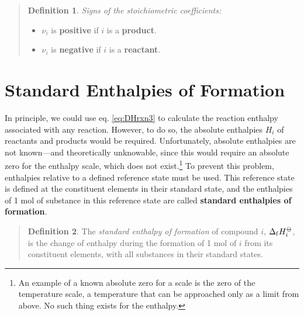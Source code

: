 \documentclass[
  9pt,
]{extbook}
\providecommand{\tightlist}{%
  \setlength{\itemsep}{0pt}\setlength{\parskip}{0pt}}
\theoremstyle{definition}
\newtheorem{definition}{Definition}[chapter]
\theoremstyle{definition}
\theoremstyle{definition}
\theoremstyle{remark}
\begin{document}
\begin{quote}
\begin{definition}
\protect\hypertarget{def:nui}{}{\label{def:nui} }\emph{Signs of the stoichiometric coefficients:}

\begin{itemize}
\tightlist
\item
  \(\nu_i\) is \textbf{positive} if \(i\) is a \textbf{product}.
\item
  \(\nu_i\) is \textbf{negative} if \(i\) is a \textbf{reactant}.
\end{itemize}
\end{definition}
\end{quote}

\hypertarget{formenthalpy}{%
\section{Standard Enthalpies of Formation}\label{formenthalpy}}

In principle, we could use eq. \eqref{eq:DHrxn3} to calculate the reaction enthalpy associated with any reaction. However, to do so, the absolute enthalpies \(H_i\) of reactants and products would be required. Unfortunately, absolute enthalpies are not known---and theoretically unknowable, since this would require an absolute zero for the enthalpy scale, which does not exist.\footnote{An example of a known absolute zero for a scale is the zero of the temperature scale, a temperature that can be approached only as a limit from above. No such thing exists for the enthalpy.} To prevent this problem, enthalpies relative to a deﬁned reference state must be used. This reference state is defined at the constituent elements in their standard state, and the enthalpies of 1 mol of substance in this reference state are called \textbf{standard enthalpies of formation}.

\begin{quote}
\begin{definition}
\protect\hypertarget{def:stdenthapies}{}{\label{def:stdenthapies} }
The \emph{standard enthalpy of formation} of compound \(i\), \(\Delta_{\mathrm{f}} H_i^{-\kern-6pt{\ominus}\kern-6pt-}\), is the change of enthalpy during the formation of 1 mol of \(i\) from its constituent elements, with all substances in their standard states.
\end{definition}
\end{quote}
\end{document}
